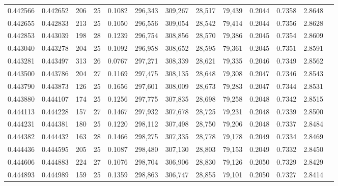 \begin{tabular}{rrrrrrrrrrrrr}
0.442566 & 0.442652 &   206 &  25 &                                     0.1082 & 296,343 & 309,267 &  28,517 &  79,439 & 0.2044 & 0.7358 & 2.8648 \\
0.442655 & 0.442833 &   213 &  25 &                                     0.1050 & 296,556 & 309,054 &  28,542 &  79,414 & 0.2044 & 0.7356 & 2.8628 \\
0.442853 & 0.443039 &   198 &  28 &                                     0.1239 & 296,754 & 308,856 &  28,570 &  79,386 & 0.2045 & 0.7354 & 2.8609 \\
0.443040 & 0.443278 &   204 &  25 &                                     0.1092 & 296,958 & 308,652 &  28,595 &  79,361 & 0.2045 & 0.7351 & 2.8591 \\
0.443281 & 0.443497 &   313 &  26 &                                     0.0767 & 297,271 & 308,339 &  28,621 &  79,335 & 0.2046 & 0.7349 & 2.8562 \\
0.443500 & 0.443786 &   204 &  27 &                                     0.1169 & 297,475 & 308,135 &  28,648 &  79,308 & 0.2047 & 0.7346 & 2.8543 \\
0.443790 & 0.443873 &   126 &  25 &                                     0.1656 & 297,601 & 308,009 &  28,673 &  79,283 & 0.2047 & 0.7344 & 2.8531 \\
0.443880 & 0.444107 &   174 &  25 &                                     0.1256 & 297,775 & 307,835 &  28,698 &  79,258 & 0.2048 & 0.7342 & 2.8515 \\
0.444113 & 0.444228 &   157 &  27 &                                     0.1467 & 297,932 & 307,678 &  28,725 &  79,231 & 0.2048 & 0.7339 & 2.8500 \\
0.444231 & 0.444381 &   180 &  25 &                                     0.1220 & 298,112 & 307,498 &  28,750 &  79,206 & 0.2048 & 0.7337 & 2.8484 \\
0.444382 & 0.444432 &   163 &  28 &                                     0.1466 & 298,275 & 307,335 &  28,778 &  79,178 & 0.2049 & 0.7334 & 2.8469 \\
0.444436 & 0.444595 &   205 &  25 &                                     0.1087 & 298,480 & 307,130 &  28,803 &  79,153 & 0.2049 & 0.7332 & 2.8450 \\
0.444606 & 0.444883 &   224 &  27 &                                     0.1076 & 298,704 & 306,906 &  28,830 &  79,126 & 0.2050 & 0.7329 & 2.8429 \\
0.444893 & 0.444989 &   159 &  25 &                                     0.1359 & 298,863 & 306,747 &  28,855 &  79,101 & 0.2050 & 0.7327 & 2.8414 \\

\end{tabular}
